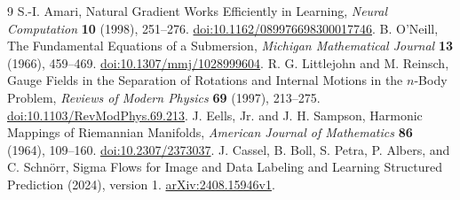 \documentclass[11pt]{article}
\begin{document}
\begin{thebibliography}{9}
S.-I. Amari, Natural Gradient Works Efficiently in Learning,
\emph{Neural Computation} \textbf{10} (1998), 251--276.
\href{https://doi.org/10.1162/089976698300017746}{doi:10.1162/089976698300017746}.
B. O'Neill, The Fundamental Equations of a Submersion,
\emph{Michigan Mathematical Journal} \textbf{13} (1966), 459--469.
\href{https://doi.org/10.1307/mmj/1028999604}{doi:10.1307/mmj/1028999604}.
R. G. Littlejohn and M. Reinsch, Gauge Fields in the Separation of Rotations and Internal Motions in the $n$-Body Problem,
\emph{Reviews of Modern Physics} \textbf{69} (1997), 213--275.
\href{https://doi.org/10.1103/RevModPhys.69.213}{doi:10.1103/RevModPhys.69.213}.
J. Eells, Jr. and J. H. Sampson, Harmonic Mappings of Riemannian Manifolds,
\emph{American Journal of Mathematics} \textbf{86} (1964), 109--160.
\href{https://doi.org/10.2307/2373037}{doi:10.2307/2373037}.
J. Cassel, B. Boll, S. Petra, P. Albers, and C. Schn\"orr,
Sigma Flows for Image and Data Labeling and Learning Structured Prediction (2024), version 1.
\href{https://arxiv.org/abs/2408.15946v1}{arXiv:2408.15946v1}.
\end{thebibliography}
\end{document}
